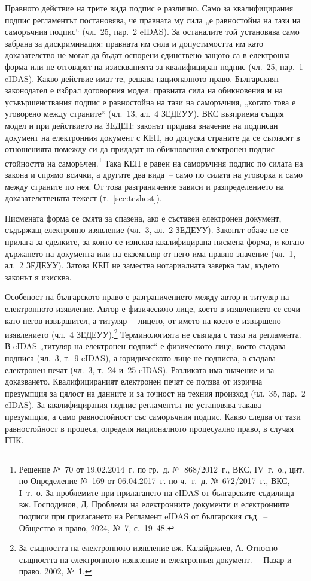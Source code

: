 Правното действие на трите вида подпис е различно. Само за квалифицирания подпис
регламентът постановява, че правната му сила „е равностойна на тази на саморъчния подпис“
(чл.~25, пар.~2 eIDAS). За останалите той установява само забрана за дискриминация:
правната им сила и допустимостта им като доказателство не могат да бъдат оспорени
единствено защото са в електронна форма или не отговарят на изискванията за квалифициран
подпис (чл.~25, пар.~1 eIDAS). Какво действие имат те, решава националното право.
Българският законодател е избрал договорния модел: правната сила на обикновения и на
усъвършенствания подпис е равностойна на тази на саморъчния, „когато това е уговорено
между страните“ (чл.~13, ал.~4 ЗЕДЕУУ). ВКС възприема същия модел и при действието на
ЗЕДЕП: законът придава значение на подписан документ на електронния документ с КЕП, но
допуска страните да се съгласят в отношенията помежду си да придадат на обикновения
електронен подпис стойността на саморъчен.\footnote{Решение №~70 от 19.02.2014~г. по
гр.~д. №~868/2012~г., ВКС, IV~г.~о., цит. по Определение №~169 от 06.04.2017~г. по ч.~т.~д.
№~672/2017~г., ВКС, I~т.~о. За проблемите при прилагането на eIDAS от българските
съдилища вж. Господинов, Д. Проблеми на електронните документи и електронните подписи при
прилагането на Регламент eIDAS от българския съд.~-- Общество и право, 2024, №~7,
с.~19--48.} Така КЕП е равен на саморъчния подпис по силата на закона и спрямо всички, а
другите два вида~-- само по силата на уговорка и само между страните по нея. От това
разграничение зависи и разпределението на доказателствената тежест
(т.~\ref{sec:tezhest}).

Писмената форма се смята за спазена, ако е съставен електронен документ, съдържащ
електронно изявление (чл.~3, ал.~2 ЗЕДЕУУ). Законът обаче не се прилага за сделките, за
които се изисква квалифицирана писмена форма, и когато държането на документа или на
екземпляр от него има правно значение (чл.~1, ал.~2 ЗЕДЕУУ). Затова КЕП не замества
нотариалната заверка там, където законът я изисква.

Особеност на българското право е разграничението между автор и титуляр на електронното
изявление. Автор е физическото лице, което в изявлението се сочи като негов извършител, а
титуляр~-- лицето, от името на което е извършено изявлението (чл.~4
ЗЕДЕУУ).\footnote{За същността на електронното изявление вж. Калайджиев, А. Относно
същността на електронното изявление и електронния документ.~-- Пазар и право, 2002, №~1.}
Терминологията не съвпада с тази на регламента. В eIDAS „титуляр на електронен подпис“ е
физическото лице, което създава подписа (чл.~3, т.~9 eIDAS), а юридическото лице не
подписва, а създава електронен печат (чл.~3, т.~24 и~25 eIDAS). Разликата има значение и
за доказването. Квалифицираният електронен печат се ползва от изрична презумпция за цялост
на данните и за точност на техния произход (чл.~35, пар.~2 eIDAS). За квалифицирания
подпис регламентът не установява такава презумпция, а само равностойност със саморъчния
подпис. Какво следва от тази равностойност в процеса, определя националното процесуално
право, в случая ГПК.


